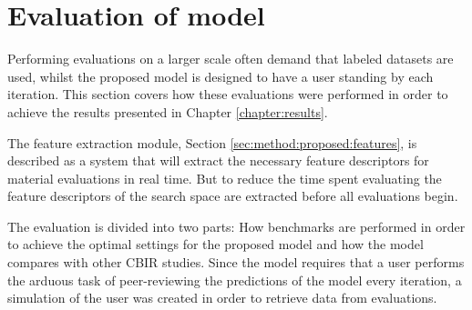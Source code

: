 
\section{Evaluation of model}
\label{sec:meth:evaluation}

Performing evaluations on a larger scale often demand that labeled datasets are used, whilst the proposed model is designed to have a user standing by each iteration. This section covers how these evaluations were performed in order to achieve the results presented in Chapter \ref{chapter:results}.

The feature extraction module, Section \ref{sec:method:proposed:features}, is described as a system that will extract the necessary feature descriptors for material evaluations in real time. But to reduce the time spent evaluating the feature descriptors of the search space are extracted before all evaluations begin.

The evaluation is divided into two parts: How benchmarks are performed in order to achieve the optimal settings for the proposed model and how the model compares with other CBIR studies. 
Since the model requires that a user performs the arduous task of peer-reviewing the predictions of the model every iteration, a simulation of the user was created in order to retrieve data from evaluations.






